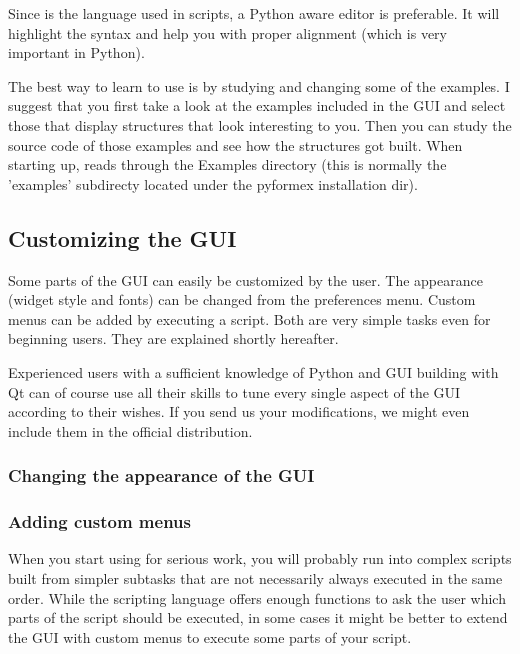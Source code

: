 Since  is the language used in \pyformex scripts, a Python aware editor is preferable. It will highlight the syntax and help you with proper alignment (which is very important in Python). 
 

The best way to learn to use \pyformex is by studying and changing some of the examples. I suggest that you first take a look at the examples included in the \pyformex GUI and select those that display structures that look interesting to you. Then you can study the source code of those examples and see how the structures got built. 
When starting up, \pyformex reads through the Examples directory (this is normally the 'examples' subdirecty located under the pyformex installation dir).  


\subsection{Customizing the GUI}
\label{sec:customize-gui}

Some parts of the \pyformex GUI can easily be customized by the user. 
The appearance (widget style and fonts) can be changed from the preferences menu. Custom menus can be added by executing a script. Both are very simple tasks even for beginning users. They are explained shortly hereafter.

Experienced users with a sufficient knowledge of Python and GUI building with Qt can of course use all their skills to tune every single aspect of the \pyformex GUI according to their wishes. If you send us your modifications, we might even include them in the official distribution.


\subsubsection{Changing the appearance of the GUI}
\label{sec:chang-appe-gui}


\subsubsection{Adding custom menus}
\label{sec:adding-custom-menus}

When you start using \pyformex for serious work, you will probably run into complex scripts built from simpler subtasks that are not necessarily always executed in the same order. While the \pyformex scripting language offers enough functions to ask the user which parts of the script should be executed, in some cases it might be better to extend the \pyformex GUI with custom menus to execute some parts of your script.

